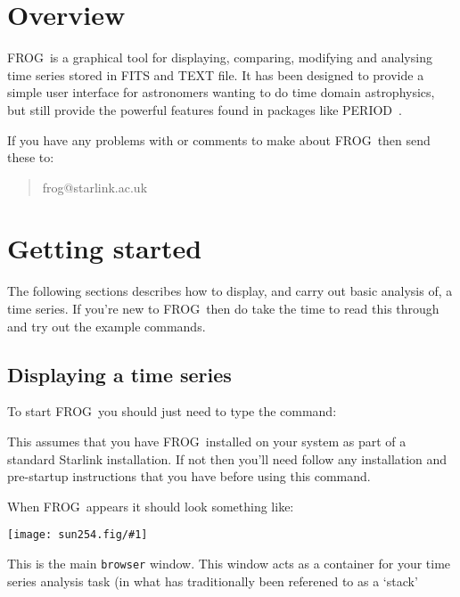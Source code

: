 \documentclass[twoside,11pt,nolof]{starlink}
\providecommand{\FROG}{\textsf{FROG}}
\providecommand{\PERIOD}{\textsf{PERIOD}}
\providecommand{\mainfigure}[1]
{\begin{center}
 \texttt{[image: sun254.fig/\#1]}
 \end{center}
}
\providecommand{\hitext}[1]{\texttt{#1}}
\begin{document}
\scfrontmatter

\section{Overview}

\FROG\ is a graphical tool for displaying, comparing, modifying and
analysing time series stored in FITS and TEXT file. It has been designed to provide a simple user interface for astronomers wanting to do time domain astrophysics, but still provide the powerful features found in packages like \PERIOD\ .

If you have any problems with or comments to make about \FROG\, then send
these to:
\begin{quote}
\begin{terminalv}
   frog@starlink.ac.uk
\end{terminalv}
\end{quote}

\section{Getting started}

The following sections describes how to display, and carry out basic analysis of, a time series. If you're new to \FROG\ then do take the time to read this through and try out the example commands.

\subsection{Displaying a time series}

To start \FROG\ you should just need to type the command:
\begin{quote}
\begin{terminalv}
\end{terminalv}
\end{quote}
This assumes that you have \FROG\ installed on your system as part of a
standard Starlink installation. If not then you'll need follow any
installation and pre-startup instructions that you have before using
this command.

When \FROG\ appears it should look something like:

\mainfigure{main_window}

This is the main \hitext{browser} window. This window acts as a container for your time series analysis task (in what has traditionally been referened to as a `stack'
\end{document}
